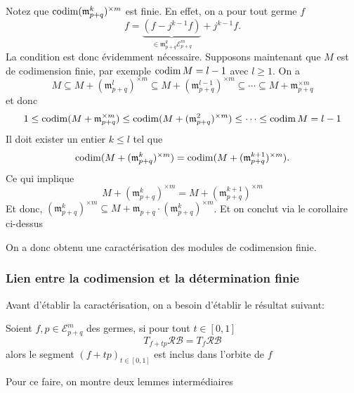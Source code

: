 \documentclass[memoire.tex]{subfiles}
\begin{document}
\begin{preuve}
    Notez que $\operatorname{codim} (\mathfrak{m}^k_{p+q})^{\times m} $ est finie. En effet, on a pour tout germe $f$
    \begin{equation*}
        f=\underbrace{(f-j^{k-1}f)}_{\in\mathfrak{m}_{p+q}^k\mathcal{E}^m_{p+q}}+j^{k-1}f.
    \end{equation*}
    La condition est donc évidemment nécessaire. Supposons maintenant que $M$ est de codimension finie, par exemple $\operatorname{codim} M=l-1$ avec $l\geq 1$. On a
    \begin{equation*}
        M\subseteq M+(\mathfrak{m}_{p+q}^{l})^{\times m}
        \subseteq M+ (\mathfrak{m}_{p+q}^{l-1})^{\times m}
        \subseteq \cdots
        \subseteq M+\mathfrak{m}_{p+q}^{\times m}
    \end{equation*}
    et donc
    \begin{equation*}
        1\leq \operatorname{codim}(M+\mathfrak{m}_{p+q}
        ^{\times m})
        \leq 
        \operatorname{codim}(M+
        (\mathfrak{m}_{p+q}^2)^
        {\times m})\leq \cdots \leq 
        \operatorname{codim} M=l-1
    \end{equation*}
    Il doit exister un entier $k\leq 
    l$ tel que
    \begin{equation*}
        \operatorname{codim}(M+(\mathfrak{m}_{p+q}^k)^
        {\times m})=
        \operatorname{codim}(M+(\mathfrak{m}_{p+q}^{k+1})^
        {\times m}).
    \end{equation*}
    Ce qui implique
    \begin{equation*}
        M+(\mathfrak{m}_{p+q}^k)^
        {\times m}=M+(\mathfrak{m}_{p+q}^{k+1})^
        {\times m}
    \end{equation*}
    Et donc, $(\mathfrak{m}_{p+q}^k)^
    {\times m}\subseteq  M+ \mathfrak{m}_{p+q}\cdot(\mathfrak{m}_{p+q}^k)^
    {\times m} $.
    Et on conclut via le corollaire ci-dessus
\end{preuve}
On a donc obtenu une caractérisation des modules de codimension finie.


\subsubsection{Lien entre la codimension et la détermination finie}

Avant d'établir la caractérisation, on a besoin d'établir le résultat suivant:
\begin{theorem}\label{segment-inclus}
    Soient $f,p\in\mathcal{E}_{p+q}^m$ des germes, si pour tout $t\in[0,1]$
    \begin{equation}\label{segment}
        T_{f+tp}\mathcal{RB}=T_f \mathcal{RB}
    \end{equation}
    alors le segment $(f+tp)_{t\in[0,1]}$ est inclus dans l'orbite de $f$
\end{theorem}
Pour ce faire, on montre deux lemmes intermédiaires
\end{document}
